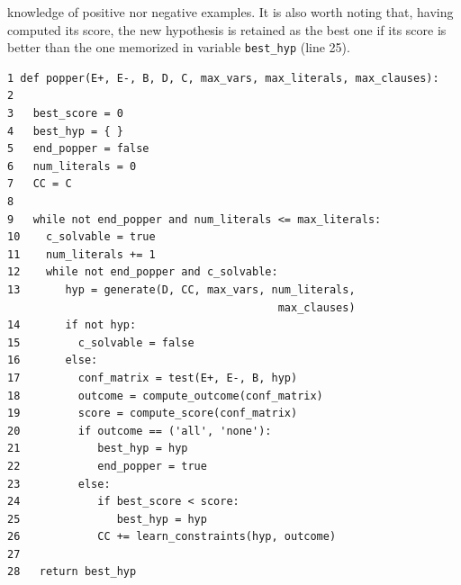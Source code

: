 knowledge of positive nor negative examples. It is also worth noting that, having computed its score, the new hypothesis is retained as the best one if its score is better than the one memorized in variable \texttt{best\_hyp} (line 25). 



\begin{algorithm}[t]
  \caption{Popper (inspired by \cite{cropper2021learning})}
  \label{alg:popper}
  \small
\begin{lstlisting}[breaklines=true, breakatwhitespace=true]
1 def popper(E+, E-, B, D, C, max_vars, max_literals, max_clauses):
2 
3   best_score = 0
4   best_hyp = { }
5   end_popper = false
6   num_literals = 0
7   CC = C
8 
9   while not end_popper and num_literals <= max_literals:
10    c_solvable = true
11    num_literals += 1
12    while not end_popper and c_solvable:
13       hyp = generate(D, CC, max_vars, num_literals, 
                                          max_clauses)
14       if not hyp: 
15         c_solvable = false
16       else:
17         conf_matrix = test(E+, E-, B, hyp)
18         outcome = compute_outcome(conf_matrix)
19         score = compute_score(conf_matrix)
20         if outcome == ('all', 'none'):
21            best_hyp = hyp
22            end_popper = true
23         else:
24            if best_score < score: 
25               best_hyp = hyp
26            CC += learn_constraints(hyp, outcome)
27
28   return best_hyp
\end{lstlisting}
\end{algorithm}









